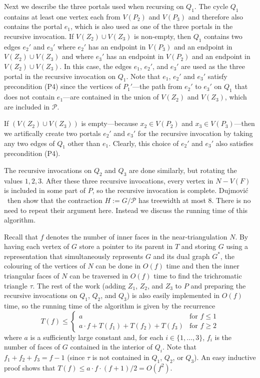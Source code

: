 \documentclass[kpfonts]{patmorin}
\let\le\leqslant
\let\ge\geqslant
\begin{document}
Next we describe the three portals used when recursing on $Q_1$.
The cycle $Q_1$ contains at least one vertex each from $V(P_2)$ and $V(P_3)$ and therefore also contains the portal $e_1$, which is also used as one of the three portals in the recursive invocation.  If $V(Z_2)\cup V(Z_3)$ is non-empty, then $Q_1$ contains two edges $e_2'$ and $e_3'$ where $e_2'$ has an endpoint in $V(P_3)$ and an endpoint in $V(Z_2)\cup V(Z_3)$ and where $e_3'$ has an endpoint in $V(P_2)$ and an endpoint in $V(Z_2)\cup V(Z_3)$.  In this case, the edges $e_1$, $e_2'$, and $e_3'$ are used as the three portal in the recursive invocation on $Q_1$.  Note that $e_1$, $e_2'$ and $e_3'$ satisfy precondition (P4) since the vertices of $P_1'$---the path from $e_2'$ to $e_3'$ on $Q_1$ that does not contain $e_1$---are contained in the union of $V(Z_2)$ and $V(Z_3)$, which are included in $\mathcal{P}$.

If $(V(Z_2)\cup V(Z_3))$ is empty---because $x_2\in V(P_2)$ and $x_3\in V(P_3)$---then we artifically create two portals $e_2'$ and $e_3'$ for the recursive invocation by taking any two edges of $Q_1$ other than $e_1$. Clearly, this choice of $e_2'$ and $e_3'$ also satisfies precondition (P4).

The recursive invocations on $Q_2$ and $Q_3$ are done similarly, but rotating the values $1,2,3$.  After these three recursive invocations, every vertex in $N-V(F)$ is included in some part of $P$, so the recursive invocation is complete.  Dujmović \etal\  then show that the contraction $H:=G/\mathcal{P}$ has treewidth at most 8. There is no need to repeat their argument here.  Instead we discuss the running time of this algorithm.

Recall that $f$ denotes the number of inner faces in the near-triangulation $N$.  By having each vertex of $G$ store a pointer to its parent in $T$ and storing $G$ using a representation that simultaneously represents $G$ and its dual graph $G^*$, the colouring of the vertices of $N$ can be done in $O(f)$ time and then the inner triangular faces of $N$ can be traversed in $O(f)$ time to find the trichromatic triangle $\tau$. The rest of the work (adding $Z_1$, $Z_2$, and $Z_3$ to $P$ and preparing the recursive invocations on $Q_1$, $Q_2$, and $Q_3$) is also easily implemented in $O(f)$ time, so the running time of the algorithm is given by the recurrence
\[  T(f) \le \begin{cases}
           a & \text{for $f\le 1$} \\
           a\cdot f + T(f_1)+T(f_2)+T(f_3) & \text{for $f\ge 2$}
         \end{cases}
 \]
where $a$ is a sufficiently large constant and, for each $i\in\{1,\ldots,3\}$, $f_i$ is the number of faces of $G$ contained in the interior of $Q_i$.
Note that $f_1+f_2+f_3=f-1$ (since $\tau$ is not contained in $Q_1$, $Q_2$, or $Q_3$).  An easy inductive proof shows that $T(f) \le a\cdot f\cdot (f+1)/2 = O(f^2)$.
\end{document}
